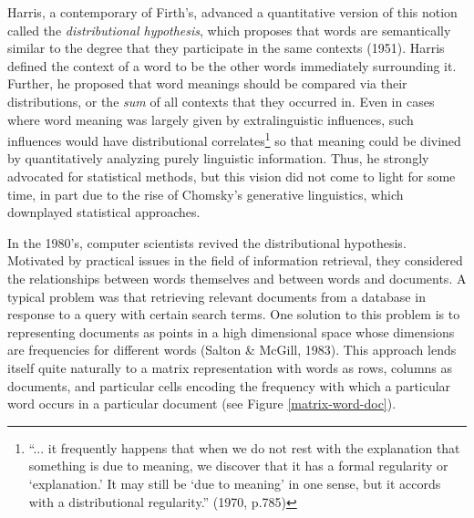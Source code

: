 \documentclass[man,floatsintext]{apa6}
\begin{document}
Harris, a contemporary of Firth's, advanced a quantitative version of
this notion called the \emph{distributional hypothesis}, which
proposes that words are semantically similar to the degree that they
participate in the same contexts (1951). Harris defined the context of
a word to be the other words immediately surrounding it. Further, he
proposed that word meanings should be compared via their
distributions, or the \emph{sum} of all contexts that they occurred
in. Even in cases where word meaning was largely given by
extralinguistic influences, such influences would have distributional
correlates\footnote{``... it frequently happens that when we do not
  rest with the explanation that something is due to meaning, we
  discover that it has a formal regularity or `explanation.' It may
  still be `due to meaning' in one sense, but it accords with a
  distributional regularity.'' (1970, p.785)} so that meaning could be
divined by quantitatively analyzing purely linguistic
information. Thus, he strongly advocated for statistical methods, but
this vision did not come to light for some time, in part due to the
rise of Chomsky's generative linguistics, which downplayed statistical
approaches.

In the 1980's, computer scientists revived the distributional
hypothesis. Motivated by practical issues in the field of information
retrieval, they considered the relationships between words themselves
and between words and documents. A typical problem was that retrieving
relevant documents from a database in response to a query with certain
search terms. One solution to this problem is to representing
documents as points in a high dimensional space whose dimensions are
frequencies for different words (Salton \& McGill, 1983). This
approach lends itself quite naturally to a matrix representation with
words as rows, columns as documents, and particular cells encoding the
frequency with which a particular word occurs in a particular document
(see Figure \ref{matrix-word-doc}).

\end{document}
